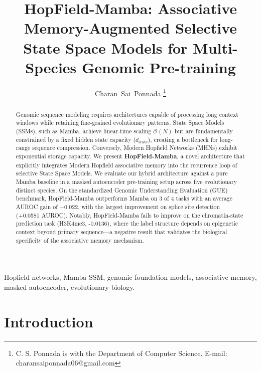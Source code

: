 \documentclass[journal,10pt]{IEEEtran}
\begin{document}
\title{HopField-Mamba: Associative Memory-Augmented Selective State Space Models for Multi-Species Genomic Pre-training}

\author{Charan~Sai~Ponnada
\thanks{C. S. Ponnada is with the Department of Computer Science. E-mail: charansaiponnada06@gmail.com}}

\maketitle

\begin{abstract}
Genomic sequence modeling requires architectures capable of processing long context windows while retaining fine-grained evolutionary patterns. State Space Models (SSMs), such as Mamba, achieve linear-time scaling $\mathcal{O}(N)$ but are fundamentally constrained by a fixed hidden state capacity ($d_{\text{state}}$), creating a bottleneck for long-range sequence compression. Conversely, Modern Hopfield Networks (MHNs) exhibit exponential storage capacity. We present \textbf{HopField-Mamba}, a novel architecture that explicitly integrates Modern Hopfield associative memory into the recurrence loop of selective State Space Models. We evaluate our hybrid architecture against a pure Mamba baseline in a masked autoencoder pre-training setup across five evolutionary distinct species. On the standardized Genomic Understanding Evaluation (GUE) benchmark, HopField-Mamba outperforms Mamba on 3 of 4 tasks with an average AUROC gain of +0.022, with the largest improvement on splice site detection (+0.0581 AUROC). Notably, HopField-Mamba fails to improve on the chromatin-state prediction task (H3K4me3, -0.0136), where the label structure depends on epigenetic context beyond primary sequence---a negative result that validates the biological specificity of the associative memory mechanism.
\end{abstract}

\begin{IEEEkeywords}
Hopfield networks, Mamba SSM, genomic foundation models, associative memory, masked autoencoder, evolutionary biology.
\end{IEEEkeywords}

\section{Introduction}
\label{sec:intro}
\end{document}
